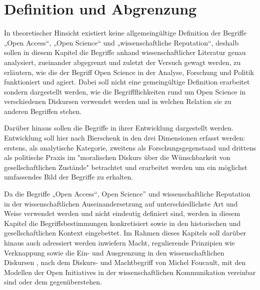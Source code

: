 \section{Definition und Abgrenzung} 
In theoretischer Hinsicht existiert keine allgemeingültige Definition der Begriffe „Open Access“, „Open Science“ und „wissenschaftliche Reputation“, deshalb sollen in diesem Kapitel die Begriffe anhand wissenschaftlicher Literatur genau analysiert, zueinander abgegrenzt und zuletzt der Versuch gewagt werden, zu erläutern, wie die der Begriff Open Science in der Analyse, Forschung und Politik funktioniert und agiert. Dabei soll nicht eine gemeingültige Definition erarbeitet sondern dargestellt werden, wie die Begriffflichkeiten rund um Open Science in verschiedenen Diskursen verwendet werden und in welchen Relation sie zu anderen Begriffen stehen.

Darüber hinaus sollen die Begriffe in ihrer Entwicklung dargestellt werden. Entwicklung soll hier nach Bierschenk in den drei Dimensionen erfasst werden: erstens, als analytische Kategorie, zweitens als Forschungsgegenstand und drittens als politische Praxis im "moralischen Diskurs über die Wünschbarkeit von gesellschaftlichen Zustände"  betrachtet und erarbeitet werden um ein möglichst umfassendes Bild der Begriffe zu erhalten. 

Da die Begriffe „Open Access“, Open Science” und wissenschaftliche Reputation in der wissenschaftlichen Auseinandersetzung auf unterschiedlichste Art und Weise verwendet werden und nicht eindeutig definiert sind, werden in diesem Kapitel die Begriffsbestimmungen konkretisiert sowie in den historischen und gesellschaftlichen Kontext eingebettet.
Im Rahmen dieses Kapitels soll darüber hinaus auch adressiert werden inwiefern Macht, regulierende Prinzipien wie Verknappung sowie die Ein- und Ausgrenzung in den wissenschaftlichen Diskursen , nach dem Diskurs- und Machtbegriff  von Michel Foucault, mit den Modellen der Open Initiatives in der wissenschaftlichen Kommunikation vereinbar sind oder dem gegenüberstehen.
